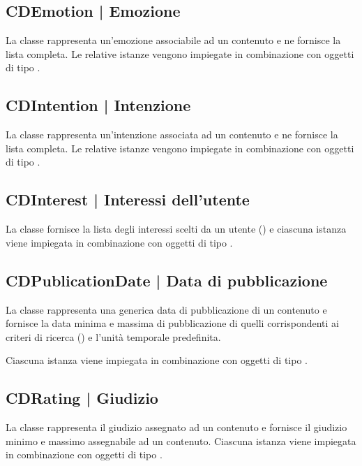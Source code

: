 \documentclass[10pt,a4paper,headinclude,footinclude,hidelinks]{scrreprt} %
\begin{document}
	\subsection[CDEmotion]{CDEmotion | Emozione}
	\label{sec:stage:design:model.criteria:emotion}
	La classe rappresenta un'emozione associabile ad un contenuto e ne fornisce la lista completa. Le relative istanze vengono impiegate in combinazione con oggetti di tipo \textit{}.

	\subsection[CDIntention]{CDIntention | Intenzione}
	\label{sec:stage:design:model.criteria:intention}
	La classe rappresenta un'intenzione associata ad un contenuto e ne fornisce la lista completa. Le relative istanze vengono impiegate in combinazione con oggetti di tipo \textit{}.

	\subsection[CDInterest]{CDInterest | Interessi dell'utente}
	\label{sec:stage:design:model.criteria:interest}
	La classe fornisce la lista degli interessi scelti da un utente (\textit{}) e ciascuna istanza viene impiegata in combinazione con oggetti di tipo \textit{}.

	\subsection[CDPublicationDate]{CDPublicationDate | Data di pubblicazione}
	\label{sec:stage:design:model.criteria:publication-date}
	La classe rappresenta una generica data di pubblicazione di un contenuto e fornisce la data minima e massima di pubblicazione di quelli corrispondenti ai criteri di ricerca (\textit{}) e l'unità temporale predefinita.

	Ciascuna istanza viene impiegata in combinazione con oggetti di tipo \textit{}.

	\subsection[CDRating]{CDRating | Giudizio}
	\label{sec:stage:design:model.criteria:rating}
	La classe rappresenta il giudizio assegnato ad un contenuto e fornisce il giudizio minimo e massimo assegnabile ad un contenuto. Ciascuna istanza viene impiegata in combinazione con oggetti di tipo \textit{}.
\end{document}
